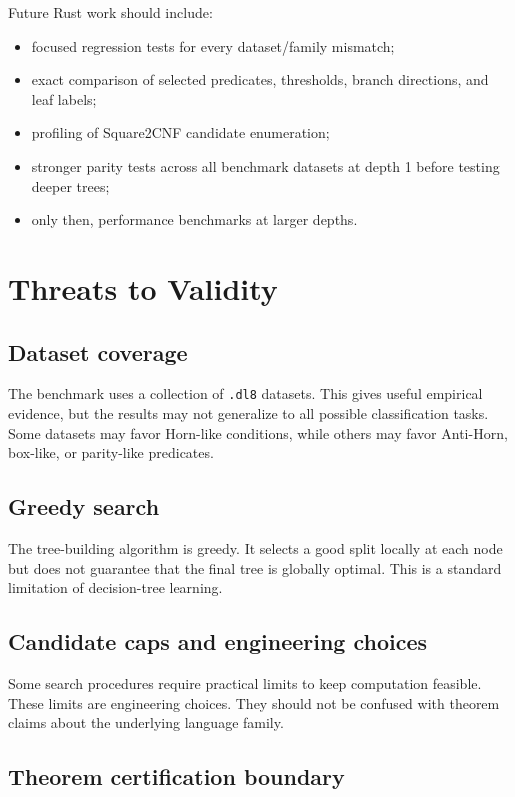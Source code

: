 \documentclass[11pt,a4paper]{article}
\begin{document}
Future Rust work should include:
\begin{itemize}
    \item focused regression tests for every dataset/family mismatch;
    \item exact comparison of selected predicates, thresholds, branch directions, and leaf labels;
    \item profiling of Square2CNF candidate enumeration;
    \item stronger parity tests across all benchmark datasets at depth 1 before testing deeper trees;
    \item only then, performance benchmarks at larger depths.
\end{itemize}

\section{Threats to Validity}

\subsection{Dataset coverage}

The benchmark uses a collection of \texttt{.dl8} datasets. This gives useful empirical evidence, but the results may not generalize to all possible classification tasks. Some datasets may favor Horn-like conditions, while others may favor Anti-Horn, box-like, or parity-like predicates.

\subsection{Greedy search}

The tree-building algorithm is greedy. It selects a good split locally at each node but does not guarantee that the final tree is globally optimal. This is a standard limitation of decision-tree learning.

\subsection{Candidate caps and engineering choices}

Some search procedures require practical limits to keep computation feasible. These limits are engineering choices. They should not be confused with theorem claims about the underlying language family.

\subsection{Theorem certification boundary}
\end{document}
